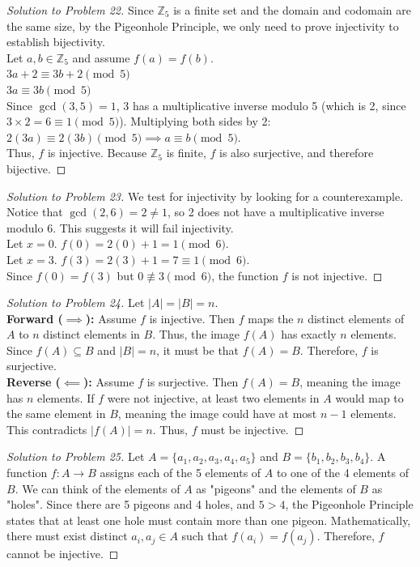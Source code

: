 \documentclass[11pt, letterpaper]{article}
\theoremstyle{definition}
\theoremstyle{remark}
\newcommand{\Z}{\mathbb{Z}}
\begin{document}
\begin{proof}[Solution to Problem 22]
Since $\Z_5$ is a finite set and the domain and codomain are the same size, by the Pigeonhole Principle, we only need to prove injectivity to establish bijectivity. \\
Let $a, b \in \Z_5$ and assume $f(a) = f(b)$. \\
$3a + 2 \equiv 3b + 2 \pmod 5$ \\
$3a \equiv 3b \pmod 5$ \\
Since $\gcd(3, 5) = 1$, 3 has a multiplicative inverse modulo 5 (which is 2, since $3 \times 2 = 6 \equiv 1 \pmod 5$). Multiplying both sides by 2: \\
$2(3a) \equiv 2(3b) \pmod 5 \implies a \equiv b \pmod 5$. \\
Thus, $f$ is injective. Because $\Z_5$ is finite, $f$ is also surjective, and therefore bijective.
\end{proof}

\begin{proof}[Solution to Problem 23]
We test for injectivity by looking for a counterexample. Notice that $\gcd(2, 6) = 2 \neq 1$, so 2 does not have a multiplicative inverse modulo 6. This suggests it will fail injectivity. \\
Let $x = 0$. $f(0) = 2(0) + 1 = 1 \pmod 6$. \\
Let $x = 3$. $f(3) = 2(3) + 1 = 7 \equiv 1 \pmod 6$. \\
Since $f(0) = f(3)$ but $0 \not\equiv 3 \pmod 6$, the function $f$ is not injective.
\end{proof}

\begin{proof}[Solution to Problem 24]
Let $|A| = |B| = n$. \\
\textbf{Forward ($\implies$):} Assume $f$ is injective. Then $f$ maps the $n$ distinct elements of $A$ to $n$ distinct elements in $B$. Thus, the image $f(A)$ has exactly $n$ elements. Since $f(A) \subseteq B$ and $|B| = n$, it must be that $f(A) = B$. Therefore, $f$ is surjective. \\
\textbf{Reverse ($\impliedby$):} Assume $f$ is surjective. Then $f(A) = B$, meaning the image has $n$ elements. If $f$ were not injective, at least two elements in $A$ would map to the same element in $B$, meaning the image could have at most $n - 1$ elements. This contradicts $|f(A)| = n$. Thus, $f$ must be injective.
\end{proof}

\begin{proof}[Solution to Problem 25]
Let $A = \{a_1, a_2, a_3, a_4, a_5\}$ and $B = \{b_1, b_2, b_3, b_4\}$. A function $f : A \to B$ assigns each of the 5 elements of $A$ to one of the 4 elements of $B$. We can think of the elements of $A$ as "pigeons" and the elements of $B$ as "holes". Since there are 5 pigeons and 4 holes, and $5 > 4$, the Pigeonhole Principle states that at least one hole must contain more than one pigeon. Mathematically, there must exist distinct $a_i, a_j \in A$ such that $f(a_i) = f(a_j)$. Therefore, $f$ cannot be injective.
\end{proof}
\end{document}
